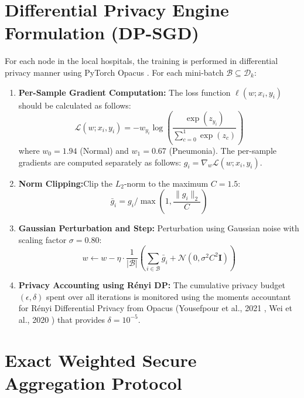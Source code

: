 \documentclass[12pt,a4paper]{report}
\begin{document}
\section{Differential Privacy Engine Formulation (DP-SGD)}
For each node in the local hospitals, the training is performed in differential privacy manner using PyTorch Opacus \cite{yousefpour2021opacus}. For each mini-batch $\mathcal{B} \subseteq \mathcal{D}_k$:
\begin{enumerate}
    \item \textbf{Per-Sample Gradient Computation:} The loss function $\ell(w; x_i, y_i)$ should be calculated as follows:
    \begin{equation}
        \mathcal{L}(w; x_i, y_i) = - w_{y_i} \log \left( \frac{\exp(z_{y_i})}{\sum_{c=0}^1 \exp(z_c)} \right)
    \end{equation}
    where $w_0 = 1.94$ (Normal) and $w_1 = 0.67$ (Pneumonia). The per-sample gradients are computed separately as follows: $g_i = \nabla_w \mathcal{L}(w; x_i, y_i)$.
    \item \textbf{Norm Clipping:}Clip the $L_2$-norm to the maximum $C = 1.5$:
    \begin{equation}
        \bar{g}_i = g_i / \max\left(1, \frac{\|g_i\|_2}{C}\right)
    \end{equation}
    \item \textbf{Gaussian Perturbation and Step:} Perturbation using Gaussian noise with scaling factor $\sigma = 0.80$:
    \begin{equation}
        w \gets w - \eta \cdot \frac{1}{|\mathcal{B}|} \left( \sum_{i \in \mathcal{B}} \bar{g}_i + \mathcal{N}(0, \sigma^2 C^2 \mathbf{I}) \right)
    \end{equation}
    \item \textbf{Privacy Accounting using Rényi DP:} The cumulative privacy budget $(\epsilon, \delta)$ spent over all iterations is monitored using the moments accountant for Rényi Differential Privacy from Opacus (Yousefpour et al., 2021 \cite{yousefpour2021opacus}, Wei et al., 2020 \cite{wei2020federated}) that provides $\delta = 10^{-5}$.
\end{enumerate}

\section{Exact Weighted Secure Aggregation Protocol}
\end{document}
